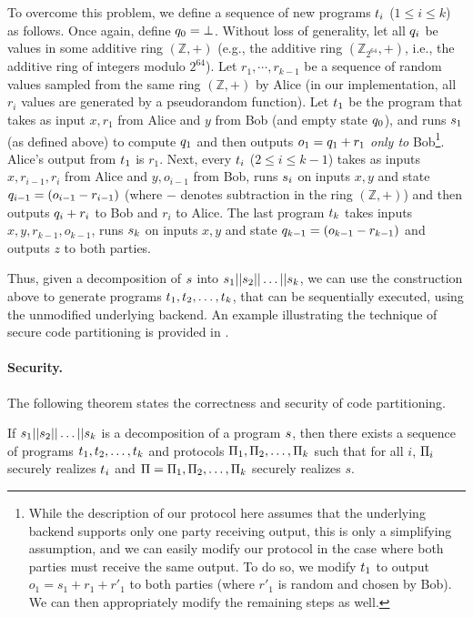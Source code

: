To overcome this problem, we define a sequence of new programs
$t_i$ ($1\leq i\leq k$) as follows. Once again, define $q_0
= \bot$. Without
loss of generality, let all $q_i$ be values in some additive ring
$(\mathbb{Z},+)$ (e.g., the additive ring $(\mathbb{Z}_{2^{64}},+)$,
i.e., the additive ring of integers modulo $2^{64}$).
Let $r_1,\cdots,r_{k-1}$ be a sequence of random values sampled from
the same ring $(\mathbb{Z},+)$ by Alice (in our implementation, all
$r_i$ values are generated by a pseudorandom function). Let $t_1$
be the program that takes as input $x,r_1$ from Alice and $y$ from Bob
(and empty state $q_0$), and runs $s_1$ (as defined above) to
compute $q_1$ and then outputs $o_1 = q_1 + r_1$ {\em only
  to} Bob\footnote{While the description of our protocol here assumes
  that
  the underlying backend supports only one party receiving output,
  this is only a simplifying assumption, and we can easily modify our
  protocol in the case where both parties must receive the same
  output. To do so, we modify $t_1$ to output $o_1 = s_1+r_1+r'_1$ to
  both parties (where $r'_1$ is random and chosen by Bob). We can then
  appropriately modify the remaining steps as well.}. Alice's output
from $t_1$ is $r_1$. Next, every $t_i$ ($2\leq i\leq k-1$)
takes as inputs $x,r_{i-1},r_i$ from Alice and $y,o_{i-1}$ from Bob,
runs $s_i$
on inputs $x,y$ and state $q_{i-1} = (o_{i-1}-r_{i-1})$ (where $-$ denotes
subtraction in the ring $(\mathbb{Z},+)$) and then outputs $q_i+r_i$
to Bob and $r_i$ to Alice. The last
program $t_k$ takes inputs $x,y,r_{k-1},o_{k-1}$, runs $s_k$
on inputs $x,y$ and state $q_{k-1} = (o_{k-1}-r_{k-1})$ and outputs $z$ to both
parties.

Thus, given a decomposition of $s$ into
$s_1||s_2||\dots||s_k$, we can use the construction
above to generate programs $t_1,t_2,\ldots,t_k$, that
can be sequentially executed, using the unmodified underlying \mpc
backend. An example illustrating the technique of secure code partitioning is provided in  .

\paragraph{Security.} The following theorem states the correctness and security of
code partitioning.

\begin{theorem}
If $s_1||s_2||\ldots||s_k$ is a decomposition of a program $s$, then there exists a sequence of programs $t_1, t_2, \ldots, t_k$ and protocols $\Pi_1, \Pi_2, \ldots, \Pi_k$ such that for all $i$, $\Pi_i$ securely realizes $t_i$ and  $\Pi
= \Pi_1,\Pi_2,\dots,\Pi_k$ securely realizes $s$.
\end{theorem}

